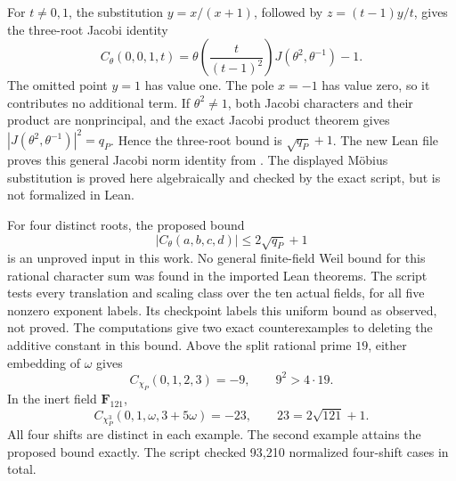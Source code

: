 \documentclass[11pt]{article}
\begin{document}
For \(t\ne0,1\), the substitution \(y=x/(x+1)\), followed by
\(z=(t-1)y/t\), gives the three-root Jacobi identity
\[
 C_\theta(0,0,1,t)=
   \theta\!\left(\frac{t}{(t-1)^2}\right)
       J(\theta^2,\theta^{-1})-1.
\]
The omitted point \(y=1\) has value one. The pole \(x=-1\) has
value zero, so it contributes no additional term.
If \(\theta^2\ne1\), both Jacobi characters and their product are
nonprincipal, and the exact Jacobi product theorem gives
\(|J(\theta^2,\theta^{-1})|^2=q_P\).
Hence the three-root bound is \(\sqrt{q_P}+1\).
The new Lean file proves this general Jacobi norm identity from
.
The displayed M\"obius substitution is proved here algebraically and
checked by the exact script, but is not formalized in Lean.

For four distinct roots, the proposed bound
\[
 |C_\theta(a,b,c,d)|\le2\sqrt{q_P}+1
\]
is an unproved input in this work. No general finite-field Weil bound
for this rational character sum was found in the imported Lean
theorems. The script tests every translation and scaling class over
the ten actual fields, for all five nonzero exponent labels.
Its checkpoint labels this uniform bound as observed, not proved.
The computations give two exact counterexamples to deleting the
additive constant in this bound. Above the split rational prime
\(19\), either embedding of \(\omega\) gives
\[
 C_{\chi_P}(0,1,2,3)=-9,\qquad 9^2>4\cdot19.
\]
In the inert field \(\mathbf F_{121}\),
\[
 C_{\chi_P^3}(0,1,\omega,3+5\omega)=-23,
 \qquad 23=2\sqrt{121}+1.
\]
All four shifts are distinct in each example.
The second example attains the proposed bound exactly.
The script checked 93,210 normalized four-shift cases in total.
\end{document}
